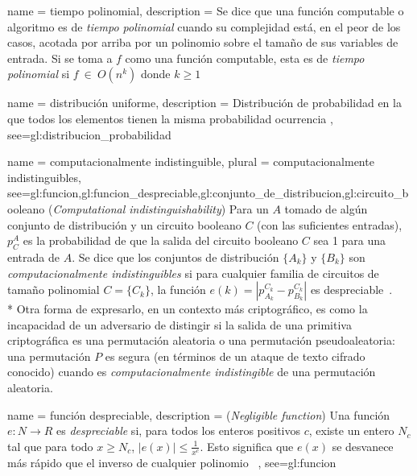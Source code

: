 {
  name = tiempo polinomial,
  description = {
    Se dice que una función computable o algoritmo es de \textit{tiempo
    polinomial} cuando su complejidad está, en el peor de los casos, acotada
    por arriba por un polinomio sobre el tamaño de sus variables de entrada.
    Si se toma a $f$ como una función computable, esta es de \textit{tiempo
    polinomial} si $f\: \in\: O(n^k)$ donde $k \ge 1$%
  }
}

{
  name = distribución uniforme,
  description = {
    Distribución de probabilidad en la que todos los elementos tienen la misma
    probabilidad ocurrencia%
  },
  see={gl:distribucion_probabilidad}
}

{
  name = computacionalmente indistinguible,
  plural = computacionalmente indistinguibles,
  see={gl:funcion,gl:funcion_despreciable,gl:conjunto_de_distribucion,gl:circuito_booleano}
}
{%
  (\textit{Computational indistinguishability}) Para un $ A $ tomado de
  algún conjunto de distribución y un circuito booleano $ C $ (con las
  suficientes entradas), $ p_C^A $ es la probabilidad de que la salida
  del circuito booleano $ C $ sea 1 para una entrada de $ A $. Se dice
  que los conjuntos de distribución $ \{ A_k \} $ y $ \{ B_k \} $ son
  \textit{computacionalmente indistinguibles} si para cualquier familia
  de circuitos de tamaño polinomial $ C = \{ C_k \} $, la función
  $ e(k) = | p_{A_k}^{C_k} - p_{B_k}^{C_k} |$ es
  despreciable~\cite{DBLP:conf/stoc/BeaverMR90}.
  \\*
  Otra forma de expresarlo, en un contexto más criptográfico, es como la
  incapacidad de un adversario de distingir si la salida de una primitiva
  criptográfica es una permutación aleatoria o una permutación pseudoaleatoria:
  una permutación $ P $ es segura (en términos de un ataque de texto cifrado
  conocido) cuando es \textit{computacionalmente indistingible} de una
  permutación aleatoria.%
}

{
  name = función despreciable,
  description = {
    (\textit{Negligible function}) Una función $ e: N \rightarrow R $ es
    \textit{despreciable} si, para todos los enteros positivos $ c $,
    existe un entero $ N_c $ tal que para todo $ x \ge N_c $,
    $ |e(x)| \le \frac{1}{x^c} $. Esto significa que $ e(x) $ se desvanece
    más rápido que el inverso de cualquier
    polinomio~\cite{DBLP:conf/stoc/BeaverMR90}%
  },
  see={gl:funcion}
}

